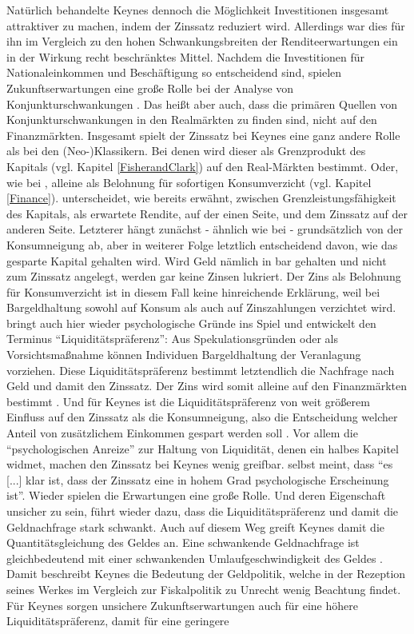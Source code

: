 Natürlich behandelte Keynes dennoch die Möglichkeit Investitionen insgesamt attraktiver zu machen, indem der Zinssatz reduziert wird. Allerdings war dies für ihn im Vergleich zu den hohen Schwankungsbreiten der Renditeerwartungen ein in der Wirkung recht beschränktes Mittel. Nachdem die Investitionen für Nationaleinkommen und Beschäftigung so entscheidend sind, spielen Zukunftserwartungen eine große Rolle bei der Analyse von Konjunkturschwankungen \parencite[S. 313]{Keynes1936}. Das heißt aber auch, dass die primären Quellen von Konjunkturschwankungen in den Realmärkten zu finden sind, nicht auf den Finanzmärkten. Insgesamt spielt der Zinssatz bei Keynes eine ganz andere Rolle als bei den (Neo-)Klassikern. Bei denen wird dieser als Grenzprodukt des Kapitals (vgl. Kapitel \ref{FisherandClark}) auf den Real-Märkten bestimmt. Oder, wie bei \textcite{Fisher1930}, alleine als Belohnung für sofortigen Konsumverzicht (vgl. Kapitel \ref{Finance}). \textcite[S. 165]{Keynes1936} unterscheidet, wie bereits erwähnt, zwischen Grenzleistungsfähigkeit des Kapitals, als erwartete Rendite, auf der einen Seite, und dem Zinssatz auf der anderen Seite. Letzterer hängt zunächst - ähnlich wie bei \textcite{Fisher1930} - grundsätzlich von der Konsumneigung \parencite[S. 166]{Keynes1936} ab, aber in weiterer Folge letztlich entscheidend davon, wie das gesparte Kapital gehalten wird. Wird Geld nämlich in bar gehalten und nicht zum Zinssatz angelegt, werden gar keine Zinsen lukriert. Der Zins als Belohnung für Konsumverzicht ist in diesem Fall keine hinreichende Erklärung, weil bei Bargeldhaltung sowohl auf Konsum als auch auf Zinszahlungen verzichtet wird. \textcite[S. 194]{Keynes1936} bringt auch hier wieder psychologische Gründe ins Spiel und entwickelt den Terminus "`Liquiditätspräferenz"': Aus Spekulationsgründen oder als Vorsichtsmaßnahme können Individuen Bargeldhaltung der Veranlagung vorziehen. Diese Liquiditätspräferenz bestimmt letztendlich die Nachfrage nach Geld und damit den Zinssatz. Der Zins wird somit alleine auf den Finanzmärkten bestimmt \parencite[S. 62]{Snowdon2005}. Und für Keynes ist die Liquiditätspräferenz von weit größerem Einfluss auf den Zinssatz als die Konsumneigung, also die Entscheidung welcher Anteil von zusätzlichem Einkommen gespart werden soll \parencite[S. 63]{Snowdon2005}. Vor allem die "`psychologischen Anreize"' zur Haltung von Liquidität, denen \textcite[S. 194ff]{Keynes1936} ein halbes Kapitel widmet, machen den Zinssatz bei Keynes wenig greifbar. \textcite[S. 202]{Keynes1936} selbst meint, dass "`es [...] klar ist, dass der Zinssatz eine in hohem Grad psychologische Erscheinung ist"'. Wieder spielen die Erwartungen eine große Rolle. Und deren Eigenschaft unsicher zu sein, führt wieder dazu, dass die Liquiditätspräferenz und damit die Geldnachfrage stark schwankt. Auch auf diesem Weg greift Keynes damit die Quantitätsgleichung des Geldes an. Eine schwankende Geldnachfrage ist gleichbedeutend mit einer schwankenden Umlaufgeschwindigkeit des Geldes \parencite[S. 201]{Keynes1936}. Damit beschreibt Keynes die Bedeutung der Geldpolitik, welche in der Rezeption seines Werkes im Vergleich zur Fiskalpolitik zu Unrecht wenig Beachtung findet. Für Keynes sorgen unsichere Zukunftserwartungen auch für eine höhere Liquiditätspräferenz, damit für eine geringere 